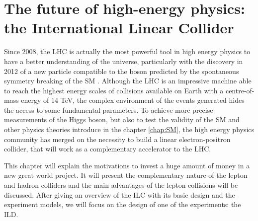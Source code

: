 \chapter[The ILC]{The future of high-energy physics: the International Linear Collider}
\label{chap:ILC}


  Since 2008, the \gls{LHC} is actually the most powerful tool in high energy physics to have a better understanding of the universe, particularly with the discovery in 2012 of a new particle compatible to the boson predicted by the spontaneous symmetry breaking of the SM \cite{Aad2012, Chatrchyan2012}.
  Although the \gls{LHC} is an impressive machine able to reach the highest energy scales of collisions available on Earth with a centre-of-mass energy of 14 TeV, the complex environment of the events generated hides the access to some fundamental parameters. 
  To achieve more precise measurements of the Higgs boson, but also to test the validity of the SM and other physics theories introduce in the chapter \ref{chap:SM}, the high energy physics community has merged on the necessity to build a linear electron-positron collider, that will work as a complementary accelerator to the \gls{LHC}.
  
  This chapter will explain the motivations to invest a huge amount of money in a new great world project. It will present the complementary nature of the lepton and hadron colliders and the main advantages of the lepton collisions will be discussed.
  After giving an overview of the ILC with its basic design and the experiment models, we will focus on the design of one of the experiments: the \gls{ILD}.

